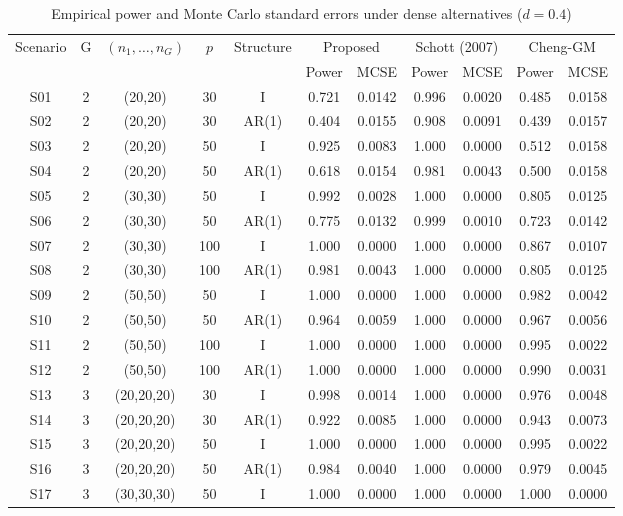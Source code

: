 \begin{table}[ht]
\centering
\caption{Empirical power and Monte Carlo standard errors under dense alternatives ($d = 0.4$)}
\label{tab:power_d40}
\scriptsize
\begin{tabular}{ccccccccccc}
\hline
Scenario & G & $(n_1,\ldots,n_G)$ & $p$ & Structure & \multicolumn{2}{c}{Proposed} & \multicolumn{2}{c}{Schott (2007)} & \multicolumn{2}{c}{Cheng-GM} \\
 & & & & & Power & MCSE & Power & MCSE & Power & MCSE \\
\hline
S01 & 2 & (20,20) & 30 & I & 0.721 & 0.0142 & 0.996 & 0.0020 & 0.485 & 0.0158 \\
S02 & 2 & (20,20) & 30 & AR(1) & 0.404 & 0.0155 & 0.908 & 0.0091 & 0.439 & 0.0157 \\
S03 & 2 & (20,20) & 50 & I & 0.925 & 0.0083 & 1.000 & 0.0000 & 0.512 & 0.0158 \\
S04 & 2 & (20,20) & 50 & AR(1) & 0.618 & 0.0154 & 0.981 & 0.0043 & 0.500 & 0.0158 \\
S05 & 2 & (30,30) & 50 & I & 0.992 & 0.0028 & 1.000 & 0.0000 & 0.805 & 0.0125 \\
S06 & 2 & (30,30) & 50 & AR(1) & 0.775 & 0.0132 & 0.999 & 0.0010 & 0.723 & 0.0142 \\
S07 & 2 & (30,30) & 100 & I & 1.000 & 0.0000 & 1.000 & 0.0000 & 0.867 & 0.0107 \\
S08 & 2 & (30,30) & 100 & AR(1) & 0.981 & 0.0043 & 1.000 & 0.0000 & 0.805 & 0.0125 \\
S09 & 2 & (50,50) & 50 & I & 1.000 & 0.0000 & 1.000 & 0.0000 & 0.982 & 0.0042 \\
S10 & 2 & (50,50) & 50 & AR(1) & 0.964 & 0.0059 & 1.000 & 0.0000 & 0.967 & 0.0056 \\
S11 & 2 & (50,50) & 100 & I & 1.000 & 0.0000 & 1.000 & 0.0000 & 0.995 & 0.0022 \\
S12 & 2 & (50,50) & 100 & AR(1) & 1.000 & 0.0000 & 1.000 & 0.0000 & 0.990 & 0.0031 \\
S13 & 3 & (20,20,20) & 30 & I & 0.998 & 0.0014 & 1.000 & 0.0000 & 0.976 & 0.0048 \\
S14 & 3 & (20,20,20) & 30 & AR(1) & 0.922 & 0.0085 & 1.000 & 0.0000 & 0.943 & 0.0073 \\
S15 & 3 & (20,20,20) & 50 & I & 1.000 & 0.0000 & 1.000 & 0.0000 & 0.995 & 0.0022 \\
S16 & 3 & (20,20,20) & 50 & AR(1) & 0.984 & 0.0040 & 1.000 & 0.0000 & 0.979 & 0.0045 \\
S17 & 3 & (30,30,30) & 50 & I & 1.000 & 0.0000 & 1.000 & 0.0000 & 1.000 & 0.0000 \\

\end{tabular}
\end{table}
